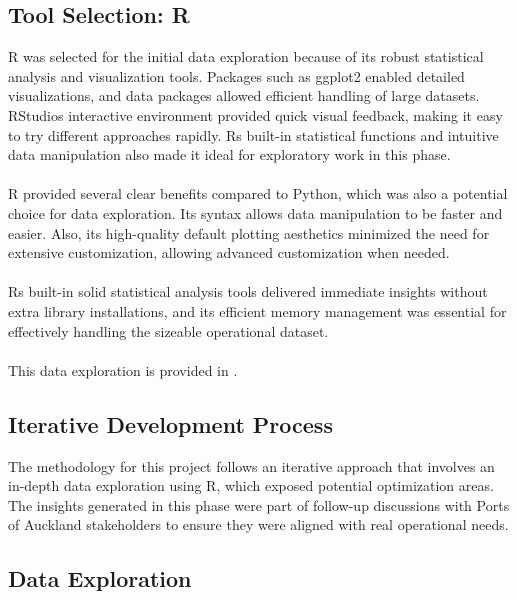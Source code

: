 		\subsection{Tool Selection: R}
			R was selected for the initial data exploration because of its robust statistical analysis and
			visualization tools. Packages such as ggplot2 enabled detailed visualizations, and data packages allowed
			efficient handling of large datasets. RStudio\’s interactive environment provided quick visual feedback,
			making it easy to try different approaches rapidly. R\’s built-in statistical functions and intuitive data
			manipulation also made it ideal for exploratory work in this phase.
			\\
			\\
			R provided several clear benefits compared to Python, which was also a potential choice for data
			exploration. Its syntax allows data manipulation to be faster and easier. Also, its high-quality default
			plotting aesthetics minimized the need for extensive customization, allowing advanced customization when
			needed.
			\\
			\\
			R\’s built-in solid statistical analysis tools delivered immediate insights without extra library
			installations, and its efficient memory management was essential for effectively handling the sizeable
			operational dataset.
			\\
			\\
			This data exploration is provided in \cite{githubrepo}.

		\subsection{Iterative Development Process}
			The methodology for this project follows an iterative approach that involves an in-depth data exploration
			using R, which exposed potential optimization areas. The insights generated in this phase were part of
			follow-up discussions with Ports of Auckland stakeholders to ensure they were aligned with real operational
			needs.

		\subsection{Data Exploration}

